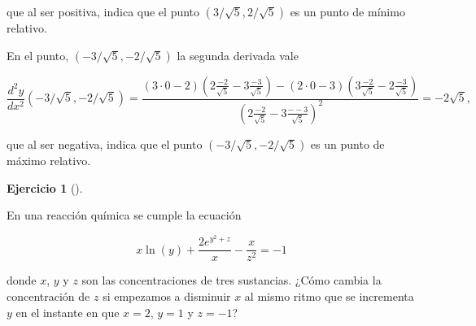 \documentclass[
  spanish,
  a4paper,
]{scrreport}
\theoremstyle{definition}
\newtheorem{exercise}{Ejercicio}[chapter]
\theoremstyle{remark}
\begin{document}
\begin{tcolorbox}
que al ser positiva, indica que el punto \((3/\sqrt{5},2/\sqrt{5})\) es
un punto de mínimo relativo.

En el punto, \((-3/\sqrt{5},-2/\sqrt{5})\) la segunda derivada vale

\[
\frac{d^{2}y}{dx^{2}}(-3/\sqrt{5},-2/\sqrt{5})=
\frac{(3\cdot 0-2)(2\frac{-2}{\sqrt{5}}-3\frac{-3}{\sqrt{5}})-(2\cdot 0-3)(3\frac{-2}{\sqrt{5}}-2\frac{-3}{\sqrt{5}})}{(2\frac{-2}{\sqrt{5}}-3\frac{--3}{\sqrt{5}})^{2}} = -2\sqrt{5},
\]

que al ser negativa, indica que el punto \((-3/\sqrt{5},-2/\sqrt{5})\)
es un punto de máximo relativo.

\end{tcolorbox}

\begin{exercise}[]\protect\hypertarget{exr-derivada-implicita-direccional}{}\label{exr-derivada-implicita-direccional}

En una reacción química se cumple la ecuación

\[
x\ln(y)+\frac{2e^{y^2+z}}{x} - \frac{x}{z^2} = -1
\]

donde \(x\), \(y\) y \(z\) son las concentraciones de tres sustancias.
¿Cómo cambia la concentración de \(z\) si empezamos a disminuir \(x\) al
mismo ritmo que se incrementa \(y\) en el instante en que \(x=2\),
\(y=1\) y \(z=-1\)?

\end{exercise}
\end{document}
